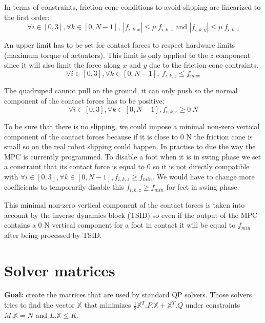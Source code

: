 \documentclass[a4paper,11pt]{article}
\begin{document}
In terms of constraints, friction cone conditions to avoid slipping are linearized to the first order:
\begin{equation}
\forall i \in [0, 3], \forall k \in [0, N-1],~|f_{i,k,x}| \leq \mu ~ f_{i,k,z} \text{ and } |f_{i,k,y}| \leq \mu ~ f_{i,k,z}
\end{equation}
 
An upper limit has to be set for contact forces to respect hardware limits (maximum torque of actuators). This limit is only applied to the $z$ component since it will also limit the force along $x$ and $y$ due to the friction cone contraints.
\begin{equation}
\forall i \in [0, 3], \forall k \in [0, N-1],~f_{i,k,z} \leq f_{max}
\end{equation}

The quadruped cannot pull on the ground, it can only push so the normal component of the contact forces has to be positive:
\begin{equation}
\forall i \in [0, 3], \forall k \in [0, N-1], f_{i,k,z} \geq 0~N
\end{equation}
 
To be sure that there is no slipping, we could impose a minimal non-zero vertical component of the contact forces because if it is close to 0 N the friction cone is small so on the real robot slipping could happen. In practise to due the way the MPC is currently programmed. To disable a foot when it is in swing phase we set a constraint that its contact force is equal to 0 so it is not directly compatible with $\forall i \in [0, 3], \forall k \in [0, N-1], f_{i,k,z} \geq f_{min}$. We would have to change more coefficients to temporarily disable this $f_{i,k,z} \geq f_{min}$ for feet in swing phase.

This minimal non-zero vertical component of the contact forces is taken into account by the inverse dynamics block (TSID) so even if the output of the MPC contains a 0 N vertical component for a foot in contact it will be equal to $f_{min}$ after being processed by TSID. 


\newpage
\section{Solver matrices}

\textbf{Goal:} create the matrices that are used by standard QP solvers. Those solvers tries to find the vector $\mathbb{X}$ that minimizes $\frac{1}{2}\mathbb{X}^T.P.\mathbb{X} + \mathbb{X}^T.Q$ under constraints $M.\mathbb{X} = N$ and $L.\mathbb{X} \leq K$.
\end{document}

